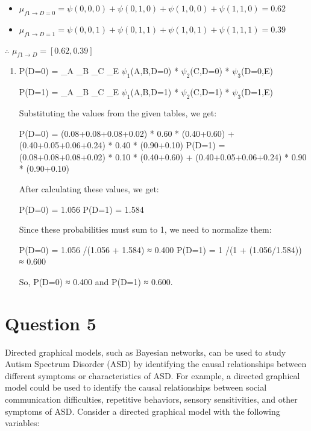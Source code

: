 \begin{itemize}
\item $\mu_{f1 \rightarrow D=0} = \psi(0,0,0)+\psi(0,1,0)+ \psi(1,0,0)+\psi(1,1,0)=0.62$

\item $\mu_{f1 \rightarrow D=1} = \psi(0,0,1)+\psi(0,1,1)+ \psi(1,0,1)+\psi(1,1,1)=0.39$

\end{itemize}

$\therefore$ $\mu_{f1 \rightarrow D} = [0.62, 0.39]$

\begin{enumerate}
\item P(D=0) = \sigma_A \sigma_B \sigma_C \sigma_E $\psi_1$(A,B,D=0) * $\psi_2$(C,D=0) *
$\psi_3$(D=0,E)

P(D=1) = \sigma_A \sigma_B \sigma_C \sigma_E $\psi_1$(A,B,D=1) * $\psi_2$(C,D=1) *
$\psi_3$(D=1,E)

Substituting the values from the given tables, we get:

P(D=0) = (0.08+0.08+0.08+0.02) * 0.60 * (0.40+0.60) +
(0.40+0.05+0.06+0.24) * 0.40 * (0.90+0.10) P(D=1) =
(0.08+0.08+0.08+0.02) * 0.10 * (0.40+0.60) +
(0.40+0.05+0.06+0.24) * 0.90 * (0.90+0.10)

After calculating these values, we get:

P(D=0) = 1.056 P(D=1) = 1.584

Since these probabilities must sum to 1, we need to normalize them:

P(D=0) = 1.056 \slash  (1.056 + 1.584) ≈ 0.400 P(D=1) = 1 \slash  (1 +
(1.056\slash 1.584)) ≈ 0.600

So, P(D=0) ≈ 0.400 and P(D=1) ≈ 0.600.

\end{enumerate}

\part{Question 5}
\label{question5}

Directed graphical models, such as Bayesian networks, can be used to
study Autism Spectrum Disorder (ASD) by identifying the causal
relationships between different symptoms or characteristics of ASD. For
example, a directed graphical model could be used to identify the causal
relationships between social communication difficulties, repetitive
behaviors, sensory sensitivities, and other symptoms of ASD. Consider a
directed graphical model with the following variables:

